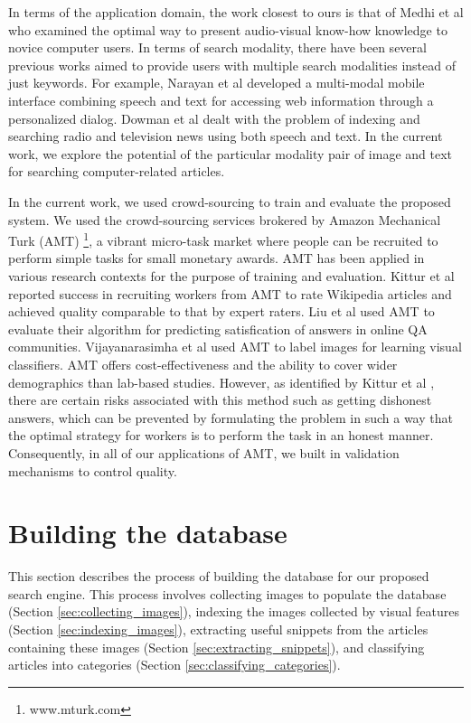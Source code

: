 \documentclass{www2010-submission}
\begin{document}
In terms of the application domain, the work closest to ours is that
of Medhi et al \cite{Medhi} who examined the optimal way to present
audio-visual know-how knowledge to novice computer users.  In terms of
search modality, there have been several previous works aimed to
provide users with multiple search modalities instead of just
keywords. For example, Narayan et al \cite{Narayan} developed a
multi-modal mobile interface combining speech and text for accessing
web information through a personalized dialog.  Dowman et al
\cite{Dowman} dealt with the problem of indexing and searching radio
and television news using both speech and text. In the current work,
we explore the potential of the particular modality pair of image and
text for searching computer-related articles.


In the current work, we used crowd-sourcing to train and evaluate the
proposed system.  We used the crowd-sourcing services brokered by
Amazon Mechanical Turk (AMT) \footnote{www.mturk.com}, a vibrant micro-task market where people
can be recruited to perform simple tasks for small monetary
awards. AMT has been applied in various research contexts for the
purpose of training and evaluation. Kittur et al \cite{Kittur}
reported success in recruiting workers from AMT to rate Wikipedia
articles and achieved quality comparable to that by expert raters.
Liu et al \cite{Liu} used AMT to evaluate their algorithm for
predicting satisfication of answers in online QA
communities. Vijayanarasimha et al \cite{Vijayanarasimha} used AMT to label images for
learning visual classifiers.  AMT offers cost-effectiveness and the ability
to cover wider demographics than lab-based studies. However, as
identified by Kittur et al \cite{Kittur}, there are certain risks associated with
this method such as getting dishonest answers, which can be prevented by
formulating the problem in such a way that the optimal strategy for workers is to
perform the task in an honest manner. Consequently, in all of our
applications of AMT, we built in validation mechanisms to control
quality.

\section{Building the database}
\label{sec:building}

This section describes the process of building the database for
our proposed search engine. This process involves collecting
images to populate the database (Section \ref{sec:collecting_images}),
indexing the images collected by visual features (Section
\ref{sec:indexing_images}), extracting useful snippets from the
articles containing these images (Section
\ref{sec:extracting_snippets}),
and classifying articles into categories (Section \ref{sec:classifying_categories}).
\vspace{0.2in}
\end{document}
